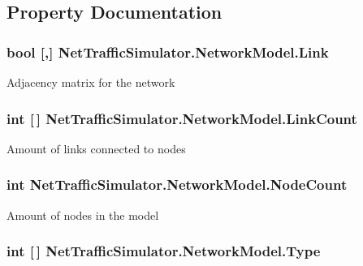 \subsection{Property Documentation}
\hypertarget{classNetTrafficSimulator_1_1NetworkModel_aa1466fa74cbddeefb31b5d7369db983e}{
\subsubsection[{Link}]{\setlength{\rightskip}{0pt plus 5cm}bool \mbox{[},\mbox{]} Net\-Traffic\-Simulator.\-Network\-Model.\-Link\hspace{0.3cm}{\ttfamily [get]}}}\label{classNetTrafficSimulator_1_1NetworkModel_aa1466fa74cbddeefb31b5d7369db983e}
Adjacency matrix for the network \hypertarget{classNetTrafficSimulator_1_1NetworkModel_ad5eb61d192908f46907fd7f91f796691}{
\subsubsection[{Link\-Count}]{\setlength{\rightskip}{0pt plus 5cm}int \mbox{[}$\,$\mbox{]} Net\-Traffic\-Simulator.\-Network\-Model.\-Link\-Count\hspace{0.3cm}{\ttfamily [get]}}}\label{classNetTrafficSimulator_1_1NetworkModel_ad5eb61d192908f46907fd7f91f796691}
Amount of links connected to nodes \hypertarget{classNetTrafficSimulator_1_1NetworkModel_ae999583acaea839a7611f610bed2fed6}{
\subsubsection[{Node\-Count}]{\setlength{\rightskip}{0pt plus 5cm}int Net\-Traffic\-Simulator.\-Network\-Model.\-Node\-Count\hspace{0.3cm}{\ttfamily [get]}}}\label{classNetTrafficSimulator_1_1NetworkModel_ae999583acaea839a7611f610bed2fed6}
Amount of nodes in the model \hypertarget{classNetTrafficSimulator_1_1NetworkModel_a92df1a7e9c05637930eae22d788f7c18}{
\subsubsection[{Type}]{\setlength{\rightskip}{0pt plus 5cm}int \mbox{[}$\,$\mbox{]} Net\-Traffic\-Simulator.\-Network\-Model.\-Type\hspace{0.3cm}{\ttfamily [get]}}}\label{classNetTrafficSimulator_1_1NetworkModel_a92df1a7e9c05637930eae22d788f7c18}

